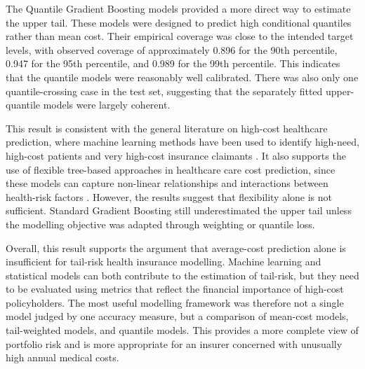 \documentclass[11pt]{article}
\begin{document}
The Quantile Gradient Boosting models provided a more direct way to estimate the upper tail. These models were designed to predict high conditional quantiles rather than mean cost. Their empirical coverage was close to the intended target levels, with observed coverage of approximately 0.896 for the 90th percentile, 0.947 for the 95th percentile, and 0.989 for the 99th percentile. This indicates that the quantile models were reasonably well calibrated. There was also only one quantile-crossing case in the test set, suggesting that the separately fitted upper-quantile models were largely coherent.

This result is consistent with the general literature on high-cost healthcare prediction, where machine learning methods have been used to identify high-need, high-cost patients and very high-cost insurance claimants \citep{osawa2020high_need_high_cost,maisog2019high_cost_claimants}. It also supports the use of flexible tree-based approaches in healthcare care cost prediction, since these models can capture non-linear relationships and interactions between health-risk factors \citep{morid2020healthcare_cost_prediction}. However, the results suggest that flexibility alone is not sufficient. Standard Gradient Boosting still underestimated the upper tail unless the modelling objective was adapted through weighting or quantile loss.

Overall, this result supports the argument that average-cost prediction alone is insufficient for tail-risk health insurance modelling. Machine learning and statistical models can both contribute to the estimation of tail-risk, but they need to be evaluated using metrics that reflect the financial importance of high-cost policyholders. The most useful modelling framework was therefore not a single model judged by one accuracy measure, but a comparison of mean-cost models, tail-weighted models, and quantile models. This provides a more complete view of portfolio risk and is more appropriate for an insurer concerned with unusually high annual medical costs.

\newpage
\end{document}
